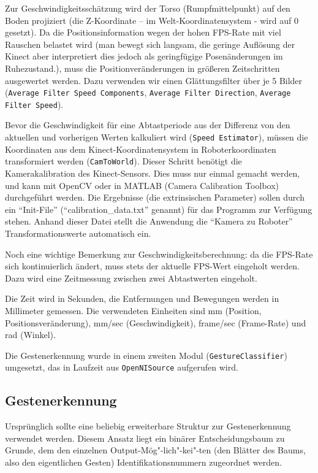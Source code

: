 Zur Geschwindigkeitsschätzung wird der Torso (Rumpfmittelpunkt) auf den Boden projiziert
 (die Z-Koordinate – im Welt-Koordinatensystem - wird auf 0 gesetzt). Da die
 Positionsinformation wegen der hohen FPS-Rate mit viel Rauschen belastet wird
 (man bewegt sich langsam, die geringe Auflösung der Kinect aber interpretiert
 dies jedoch als geringfügige Posenänderungen im Ruhezustand.), muss die Positionveränderungen
 in größeren Zeitschritten ausgewertet werden. Dazu verwenden wir einen Glättungsfilter über
 je 5 Bilder (\lstinline{Average Filter Speed Components}, \lstinline{Average Filter Direction}, \lstinline{Average Filter Speed}).
 
Bevor die Geschwindigkeit für eine Abtastperiode aus der Differenz von den
aktuellen und vorherigen Werten kalkuliert wird (\lstinline{Speed Estimator}),
müssen die Koordinaten aus dem Kinect-Koordinatensystem in Roboterkoordinaten transformiert werden
 (\lstinline{CamToWorld}). Dieser Schritt benötigt die Kamerakalibration des
 Kinect-Sensors. Dies muss nur einmal gemacht werden, und kann mit OpenCV oder
 in MATLAB (Camera Calibration Toolbox) durchgeführt werden. Die Ergebnisse (die extrinsischen Parameter)
 sollen durch ein ``Init-File'' (``calibration\_data.txt'' genannt) für das
 Programm zur Verfügung stehen.
 Anhand dieser Datei stellt die Anwendung die ``Kamera zu Roboter'' Transformationswerte automatisch ein.
 
Noch eine wichtige Bemerkung zur Geschwindigkeitsberechnung: da die FPS-Rate
 sich kontinuierlich ändert, muss stets der aktuelle FPS-Wert eingeholt werden.
 Dazu wird eine Zeitmessung zwischen zwei Abtastwerten eingeholt.

Die Zeit wird in Sekunden, die Entfernungen und Bewegungen werden in Millimeter gemessen.
 Die verwendeten Einheiten sind mm (Position, Positionsveränderung), mm/sec
 (Geschwindigkeit), frame/sec (Frame-Rate) und rad (Winkel).

Die Gestenerkennung wurde in einem zweiten Modul (\lstinline{GestureClassifier})
umgesetzt, das in Laufzeit aus \lstinline{OpenNISource} aufgerufen wird.

\subsection{Gestenerkennung}

Ursprünglich sollte eine beliebig erweiterbare Struktur zur Gestenerkennung verwendet werden.
 Diesem Ansatz liegt ein binärer Entscheidungsbaum zu Grunde, dem den einzelnen
 Output-Mög"-lich"-kei"-ten (den Blätter des Baums, also den eigentlichen
 Gesten) Identifikationsnummern zugeordnet werden.

